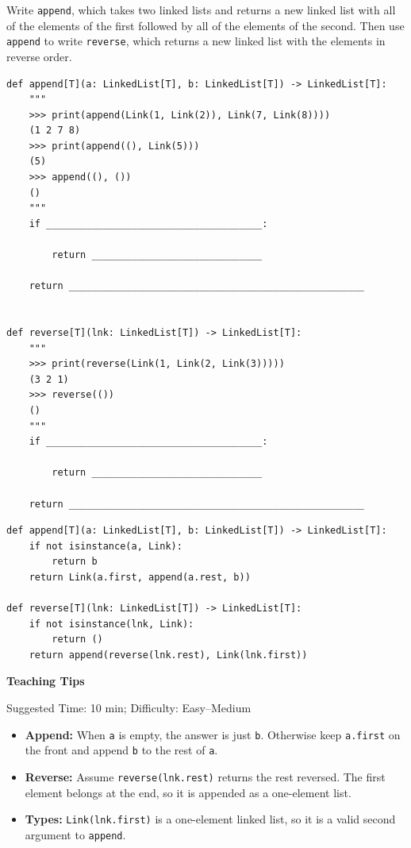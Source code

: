 \begin{blocksection}
\question Write \lstinline{append}, which takes two linked lists and returns a new linked list with all of the elements of the first followed by all of the elements of the second. Then use \lstinline{append} to write \lstinline{reverse}, which returns a new linked list with the elements in reverse order.

\begin{lstlisting}
def append[T](a: LinkedList[T], b: LinkedList[T]) -> LinkedList[T]:
    """
    >>> print(append(Link(1, Link(2)), Link(7, Link(8))))
    (1 2 7 8)
    >>> print(append((), Link(5)))
    (5)
    >>> append((), ())
    ()
    """
    if ______________________________________:

        return ______________________________

    return ____________________________________________________


def reverse[T](lnk: LinkedList[T]) -> LinkedList[T]:
    """
    >>> print(reverse(Link(1, Link(2, Link(3)))))
    (3 2 1)
    >>> reverse(())
    ()
    """
    if ______________________________________:

        return ______________________________

    return ____________________________________________________
\end{lstlisting}
\begin{solution}[1in]
\begin{lstlisting}
def append[T](a: LinkedList[T], b: LinkedList[T]) -> LinkedList[T]:
    if not isinstance(a, Link):
        return b
    return Link(a.first, append(a.rest, b))

def reverse[T](lnk: LinkedList[T]) -> LinkedList[T]:
    if not isinstance(lnk, Link):
        return ()
    return append(reverse(lnk.rest), Link(lnk.first))
\end{lstlisting}
\end{solution}
\end{blocksection}

\begin{questionmeta}
\textbf{Teaching Tips}\par\nopagebreak[4]
Suggested Time: 10 min; Difficulty: Easy--Medium
\nopagebreak[4]
\begin{itemize}
    \item \textbf{Append:} When \lstinline{a} is empty, the answer is just \lstinline{b}. Otherwise keep \lstinline{a.first} on the front and append \lstinline{b} to the rest of \lstinline{a}.
    \item \textbf{Reverse:} Assume \lstinline{reverse(lnk.rest)} returns the rest reversed. The first element belongs at the end, so it is appended as a one-element list.
    \item \textbf{Types:} \lstinline{Link(lnk.first)} is a one-element linked list, so it is a valid second argument to \lstinline{append}.
\end{itemize}
\end{questionmeta}
